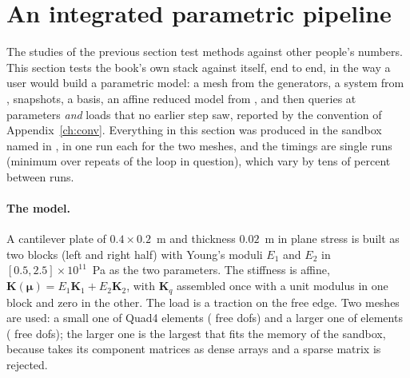 











\section{An integrated parametric pipeline}\label{sec:vf-pipeline}

The studies of the previous section test methods against other people's numbers. This section tests the book's own stack against itself, end to end, in the way a user would build a parametric model: a mesh from the generators, a system from \fea{}, snapshots, a basis, an affine reduced model from \rom{}, and then queries at parameters \emph{and} loads that no earlier step saw, reported by the convention of Appendix~\ref{ch:conv}. Everything in this section was produced in the sandbox named in , in one run each for the two meshes, and the timings are single runs (minimum over repeats of the loop in question), which vary by tens of percent between runs.

\paragraph{The model.}
A cantilever plate of $0.4\times0.2$~m and thickness $0.02$~m in plane stress is built as two blocks (left and right half) with Young's moduli $E_1$ and $E_2$ in $[0.5,2.5]\times10^{11}$~Pa as the two parameters. The stiffness is affine, $\bm K(\bm\mu)=E_1\bm K_1+E_2\bm K_2$, with $\bm K_q$ assembled once with a unit modulus in one block and zero in the other. The load is a traction on the free edge. Two meshes are used: a small one of \cplSElems{} Quad4 elements (\cplSFree{} free dofs) and a larger one of \cplLElems{} elements (\cplLFree{} free dofs); the larger one is the largest that fits the memory of the sandbox, because  takes its component matrices as dense arrays and a sparse matrix is rejected.


